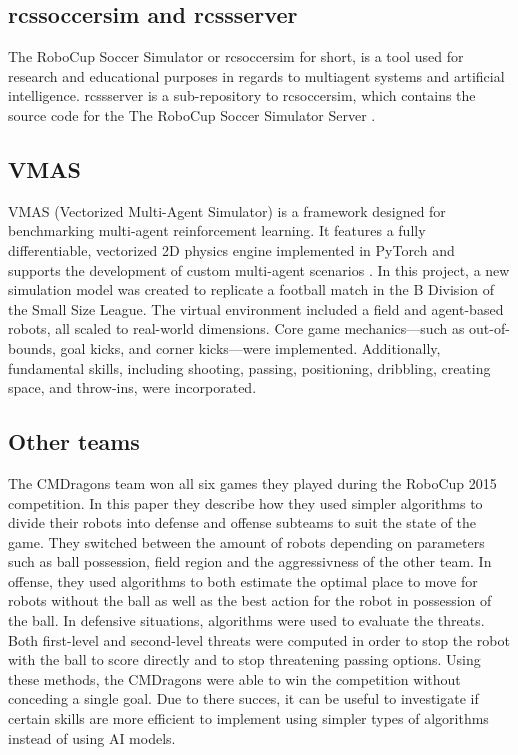 \subsection{rcssoccersim and rcssserver}
The RoboCup Soccer Simulator or rcsoccersim for short, is a tool used for research and educational purposes in regards to multiagent systems and artificial intelligence. rcssserver is a sub-repository to rcsoccersim, which contains the source code for the The RoboCup Soccer Simulator Server \cite{rcsoccersim1}.

\subsection{VMAS}
VMAS (Vectorized Multi-Agent Simulator) is a framework designed for benchmarking multi-agent reinforcement learning. It features a fully differentiable, vectorized 2D physics engine implemented in PyTorch and supports the development of custom multi-agent scenarios \cite{bettini2022vmas}. In this project, a new simulation model was created to replicate a football match in the B Division of the Small Size League. The virtual environment included a field and agent-based robots, all scaled to real-world dimensions. Core game mechanics—such as out-of-bounds, goal kicks, and corner kicks—were implemented. Additionally, fundamental skills, including shooting, passing, positioning, dribbling, creating space, and throw-ins, were incorporated.

\subsection{Other teams}
The CMDragons team won all six games they played during the RoboCup 2015 competition. In this paper they 
describe how they used simpler algorithms to divide their robots into defense and offense subteams to suit the state 
of the game. They switched between the amount of robots depending on parameters such as ball possession, 
field region and the aggressivness of the other team. In offense, they used algorithms to both estimate the 
optimal place to move for robots without the ball as well as the best action for the robot in possession of the 
ball. In defensive situations, algorithms were used to evaluate the threats. Both first-level and second-level 
threats were computed in order to stop the robot with the ball to score directly and to stop threatening passing 
options. Using these methods, the CMDragons were able to win the competition without conceding a single goal\cite{CMDragons2015}.
Due to there succes, it can be useful to investigate if certain skills are more efficient to implement using simpler
types of algorithms instead of using AI models. 
